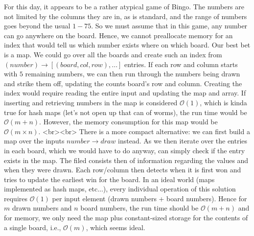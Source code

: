 For this day, it appears to be a rather atypical game of Bingo. The numbers are not limited by the columns they are in, as is standard, and the range of numbers goes beyond the usual $1-75$. So we must assume that in this game, any number can go anywhere on the board. Hence, we cannot preallocate memory for an index that would tell us which number exists where on which board. Our best bet is a map. We could go over all the boards and create such an index from $(number) \rightarrow [(board, col, row), ...]$ entries. If each row and column starts with $5$ remaining numbers, we can then run through the numbers being drawn and strike them off, updating the counts board's row and column. Creating the index would require reading the entire input and updating the map and array. If inserting and retrieving numbers in the map is considered $\mathcal{O}(1)$, which is kinda true for hash maps (let's not open up that can of worms), the run time would be $\mathcal{O}(m + n)$. However, the memory consumption for this map would be $\mathcal{O}(m \times n)$. 
<br><br>
There is a more compact alternative: we can first build a map over the inputs $number \rightarrow draw$ instead. As we then iterate over the entries in each board, which we would have to do anyway, can simply check if the entry exists in the map. 
The filed consists then of information regarding the values and when they were drawn. Each row/column then detects when it is first won and tries to update the earliest win for the board. In an ideal world (maps implemented as hash maps, etc...), every individual operation of this solution requires $\mathcal{O}(1)$ per input element (drawn numbers + board numbers). Hence for $m$ drawn numbers and $n$ board numbers, the run time should be $\mathcal{O}(m + n)$ and for memory, we only need the map plus constant-sized storage for the contents of a single board, i.e., $\mathcal{O}(m)$, which seems ideal. 